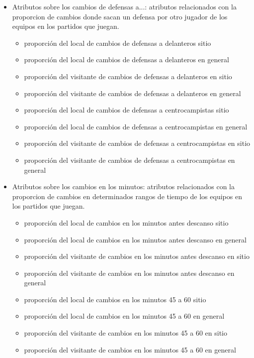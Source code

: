 \begin{itemize}
\begin{itemize}
    \end{itemize}
    \item Atributos sobre los cambios de defensas a...: atributos relacionados con la proporcion de cambios donde sacan un defensa por otro jugador de los equipos en los partidos que juegan.
    \begin{itemize}
        \item proporción del local de cambios de defensas a delanteros sitio
        \item proporción del local de cambios de defensas a delanteros en general
        \item proporción del visitante de cambios de defensas a delanteros en sitio
        \item proporción del visitante de cambios de defensas a delanteros en general
        \item proporción del local de cambios de defensas a centrocampistas sitio
        \item proporción del local de cambios de defensas a centrocampistas en general
        \item proporción del visitante de cambios de defensas a centrocampistas en sitio
        \item proporción del visitante de cambios de defensas a centrocampistas en general
    \end{itemize}
    \item Atributos sobre los cambios en los minutos: atributos relacionados con la proporcion de cambios en determinados rangos de tiempo de los equipos en los partidos que juegan.
    \begin{itemize}
        \item proporción del local de cambios en los minutos antes descanso sitio
        \item proporción del local de cambios en los minutos antes descanso en general
        \item proporción del visitante de cambios en los minutos antes descanso en sitio
        \item proporción del visitante de cambios en los minutos antes descanso en general
        \item proporción del local de cambios en los minutos 45 a 60 sitio
        \item proporción del local de cambios en los minutos 45 a 60 en general
        \item proporción del visitante de cambios en los minutos 45 a 60 en sitio
        \item proporción del visitante de cambios en los minutos 45 a 60 en general

\end{itemize}
\end{itemize}
